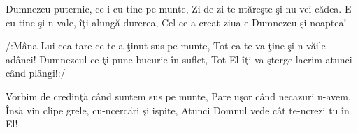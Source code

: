 
\beginverse
Dumnezeu puternic, ce-i cu tine pe munte,
Zi de zi te-ntăreşte şi nu vei cădea.
E cu tine şi-n vale, îţi alungă durerea,
Cel ce a creat ziua e Dumnezeu și noaptea!
\endverse

\beginchorus
/:Mâna Lui cea tare ce te-a ţinut sus pe munte,
Tot ea te va ţine şi-n văile adânci!
Dumnezeul ce-ţi pune bucurie în suflet,
Tot El îţi va şterge lacrim-atunci când plângi!:/
\endchorus

\beginverse
Vorbim de credinţă când suntem sus pe munte,
Pare uşor când necazuri n-avem,
Însă vin clipe grele, cu-ncercări şi ispite,
Atunci Domnul vede cât te-ncrezi tu în El!
\endverse

\endsong

